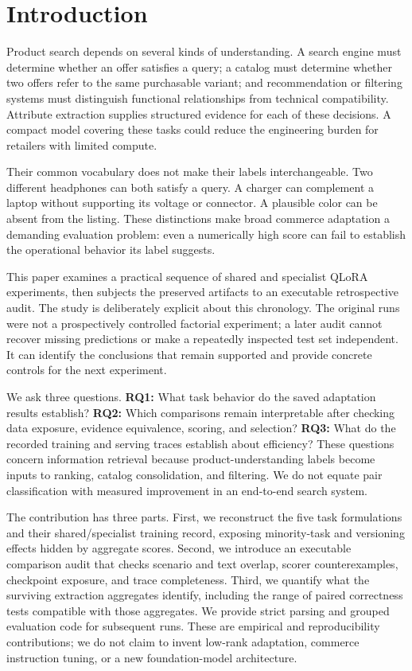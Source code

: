 \section{Introduction}
Product search depends on several kinds of understanding. A search engine must determine whether an offer satisfies a query; a catalog must determine whether two offers refer to the same purchasable variant; and recommendation or filtering systems must distinguish functional relationships from technical compatibility. Attribute extraction supplies structured evidence for each of these decisions. A compact model covering these tasks could reduce the engineering burden for retailers with limited compute.

Their common vocabulary does not make their labels interchangeable. Two different headphones can both satisfy a query. A charger can complement a laptop without supporting its voltage or connector. A plausible color can be absent from the listing. These distinctions make broad commerce adaptation a demanding evaluation problem: even a numerically high score can fail to establish the operational behavior its label suggests.

This paper examines a practical sequence of shared and specialist QLoRA experiments, then subjects the preserved artifacts to an executable retrospective audit. The study is deliberately explicit about this chronology. The original runs were not a prospectively controlled factorial experiment; a later audit cannot recover missing predictions or make a repeatedly inspected test set independent. It can identify the conclusions that remain supported and provide concrete controls for the next experiment.

We ask three questions. \textbf{RQ1:} What task behavior do the saved adaptation results establish? \textbf{RQ2:} Which comparisons remain interpretable after checking data exposure, evidence equivalence, scoring, and selection? \textbf{RQ3:} What do the recorded training and serving traces establish about efficiency? These questions concern information retrieval because product-understanding labels become inputs to ranking, catalog consolidation, and filtering. We do not equate pair classification with measured improvement in an end-to-end search system.

The contribution has three parts. First, we reconstruct the five task formulations and their shared/specialist training record, exposing minority-task and versioning effects hidden by aggregate scores. Second, we introduce an executable comparison audit that checks scenario and text overlap, scorer counterexamples, checkpoint exposure, and trace completeness. Third, we quantify what the surviving extraction aggregates identify, including the range of paired correctness tests compatible with those aggregates. We provide strict parsing and grouped evaluation code for subsequent runs. These are empirical and reproducibility contributions; we do not claim to invent low-rank adaptation, commerce instruction tuning, or a new foundation-model architecture.

